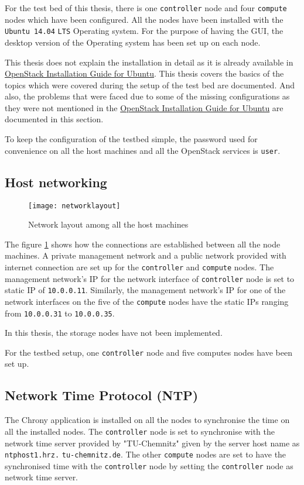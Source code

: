For the test bed of this thesis, there is one \verb|controller| node and four \verb|compute| nodes which have been configured.
All the nodes have been installed with the \verb|Ubuntu 14.04| \verb|LTS| Operating system.
For the purpose of having the GUI, the desktop version of the Operating system has been set up on each node.

This thesis does not explain the installation in detail as it is already available in \href{http://docs.openstack.org/liberty/install-guide-ubuntu/} {OpenStack Installation Guide for Ubuntu}.
This thesis covers the basics of the topics which were covered during the setup of the test bed are documented. And also, the problems that were faced due to some of the missing configurations as they were not mentioned in the \href{http://docs.openstack.org/liberty/install-guide-ubuntu/} {OpenStack Installation Guide for Ubuntu} are documented in this section.

To keep the configuration of the testbed simple, the password used for convenience on all the host machines and all the OpenStack services is \verb|user|.


\subsection{Host networking}\label{ssec:Hostnetworkingarchitecture}

\begin{figure}[H]
  \centering
  \texttt{[image: networklayout]}
  \caption{Network layout among all the host machines\cite{OpenStack:networklayout}}\label{fig:networklayout}
\end{figure}
The figure \ref{fig:networklayout} shows how the connections are established between all the node machines.
A private management network and a public network provided with internet connection are set up for the \verb|controller| and \verb|compute| nodes.
The management network's IP for the network interface of \verb|controller| node is set to static IP of \verb|10.0.0.11|.
Similarly, the management network's IP for one of the network interfaces on the five of the \verb|compute| nodes have the static IPs ranging from \verb|10.0.0.31| to \verb|10.0.0.35|.

In this thesis, the storage nodes have not been implemented.

For the testbed setup, one \verb|controller| node and five computes nodes have been set up.


\subsection{Network Time Protocol (NTP)}\label{ssec:NetworkTimeProtocol_NTP}
The Chrony application is installed on all the nodes to synchronise the time on all the installed nodes.
The \verb|controller| node is set to synchronise with the network time server provided by "TU-Chemnitz" given by the server host name as \verb|ntphost1.hrz.| \verb|tu-chemnitz.de|.
The other \verb|compute| nodes are set to have the synchronised time with the \verb|controller| node by setting the \verb|controller| node as network time server.

